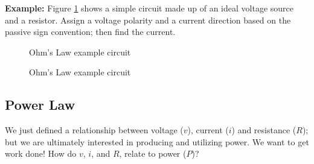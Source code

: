 \documentclass{handout}
\begin{document}
\textbf{Example:}  Figure \ref{fig: OhmsLawExample} shows a simple circuit made up of an ideal voltage source and a resistor.  Assign a voltage polarity and a current direction based on the passive sign convention; then find the current.

\begin{figure}
\centering
{}
\caption{Ohm's Law example circuit}
\label{fig: OhmsLawExample}
\end{figure}


\begin{figure}
\centering
{}
\caption{Ohm's Law example circuit}
\label{fig: OhmsLawExampleSolution}
\end{figure}


\subsection{Power Law}
We just defined a relationship between voltage ($v$), current ($i$) and resistance ($R$); but we are ultimately interested in producing and utilizing power.  We want to get work done!  How do $v$, $i$, and $R$, relate to power ($P$)?
\end{document}
